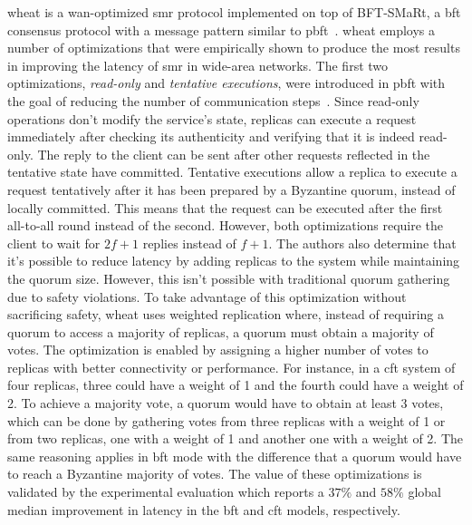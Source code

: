 \acrfull{wheat} is a \acrshort{wan}-optimized \acrshort{smr} protocol implemented on top of BFT-SMaRt, a \acrshort{bft} consensus protocol with a message pattern similar to \acrshort{pbft}~\cite{Sousa2016,Bessani:2014}. \acrshort{wheat} employs a number of optimizations that were empirically shown to produce the most results in improving the latency of \acrshort{smr} in wide-area networks. The first two optimizations, \textit{read-only} and \textit{tentative executions}, were introduced in \acrshort{pbft} with the goal of reducing the number of communication steps~\cite{Castro1999}. Since read-only operations don't modify the service's state, replicas can execute a request immediately after checking its authenticity and verifying that it is indeed read-only. The reply to the client can be sent after other requests reflected in the tentative state have committed. Tentative executions allow a replica to execute a request tentatively after it has been prepared by a Byzantine quorum, instead of locally committed. This means that the request can be executed after the first all-to-all round instead of the second. However, both optimizations require the client to wait for $2f+1$ replies instead of $f+1$. The authors also determine that it's possible to reduce latency by adding replicas to the system while maintaining the quorum size. However, this isn't possible with traditional quorum gathering due to safety violations. To take advantage of this optimization without sacrificing safety, \acrshort{wheat} uses weighted replication where, instead of requiring a quorum to access a majority of replicas, a quorum must obtain a majority of votes. The optimization is enabled by assigning a higher number of votes to replicas with better connectivity or performance. For instance, in a \acrshort{cft} system of four replicas, three could have a weight of 1 and the fourth could have a weight of 2. To achieve a majority vote, a quorum would have to obtain at least 3 votes, which can be done by gathering votes from three replicas with a weight of 1 or from two replicas, one with a weight of 1 and another one with a weight of 2. The same reasoning applies in \acrshort{bft} mode with the difference that a quorum would have to reach a Byzantine majority of votes. The value of these optimizations is validated by the experimental evaluation which reports a $37\%$ and $58\%$ global median improvement in latency in the \acrshort{bft} and \acrshort{cft} models, respectively. \par
